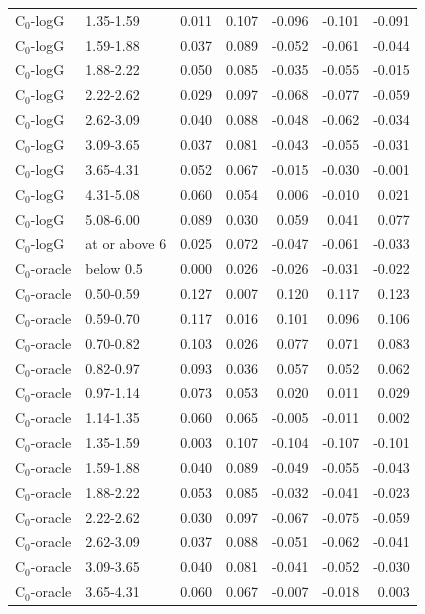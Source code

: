 \begin{longtable}{llrrrrr}
C$_0$-logG & 1.35-1.59 & 0.011 & 0.107 & -0.096 & -0.101 & -0.091 \\
C$_0$-logG & 1.59-1.88 & 0.037 & 0.089 & -0.052 & -0.061 & -0.044 \\
C$_0$-logG & 1.88-2.22 & 0.050 & 0.085 & -0.035 & -0.055 & -0.015 \\
C$_0$-logG & 2.22-2.62 & 0.029 & 0.097 & -0.068 & -0.077 & -0.059 \\
C$_0$-logG & 2.62-3.09 & 0.040 & 0.088 & -0.048 & -0.062 & -0.034 \\
C$_0$-logG & 3.09-3.65 & 0.037 & 0.081 & -0.043 & -0.055 & -0.031 \\
C$_0$-logG & 3.65-4.31 & 0.052 & 0.067 & -0.015 & -0.030 & -0.001 \\
C$_0$-logG & 4.31-5.08 & 0.060 & 0.054 & 0.006 & -0.010 & 0.021 \\
C$_0$-logG & 5.08-6.00 & 0.089 & 0.030 & 0.059 & 0.041 & 0.077 \\
C$_0$-logG & at or above 6 & 0.025 & 0.072 & -0.047 & -0.061 & -0.033 \\
C$_0$-oracle & below 0.5 & 0.000 & 0.026 & -0.026 & -0.031 & -0.022 \\
C$_0$-oracle & 0.50-0.59 & 0.127 & 0.007 & 0.120 & 0.117 & 0.123 \\
C$_0$-oracle & 0.59-0.70 & 0.117 & 0.016 & 0.101 & 0.096 & 0.106 \\
C$_0$-oracle & 0.70-0.82 & 0.103 & 0.026 & 0.077 & 0.071 & 0.083 \\
C$_0$-oracle & 0.82-0.97 & 0.093 & 0.036 & 0.057 & 0.052 & 0.062 \\
C$_0$-oracle & 0.97-1.14 & 0.073 & 0.053 & 0.020 & 0.011 & 0.029 \\
C$_0$-oracle & 1.14-1.35 & 0.060 & 0.065 & -0.005 & -0.011 & 0.002 \\
C$_0$-oracle & 1.35-1.59 & 0.003 & 0.107 & -0.104 & -0.107 & -0.101 \\
C$_0$-oracle & 1.59-1.88 & 0.040 & 0.089 & -0.049 & -0.055 & -0.043 \\
C$_0$-oracle & 1.88-2.22 & 0.053 & 0.085 & -0.032 & -0.041 & -0.023 \\
C$_0$-oracle & 2.22-2.62 & 0.030 & 0.097 & -0.067 & -0.075 & -0.059 \\
C$_0$-oracle & 2.62-3.09 & 0.037 & 0.088 & -0.051 & -0.062 & -0.041 \\
C$_0$-oracle & 3.09-3.65 & 0.040 & 0.081 & -0.041 & -0.052 & -0.030 \\
C$_0$-oracle & 3.65-4.31 & 0.060 & 0.067 & -0.007 & -0.018 & 0.003 \\

\end{longtable}
